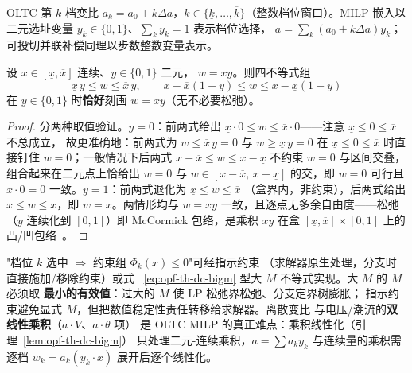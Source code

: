 \begin{definition}[离散档位与选址变量]\label{def:opf-th-dc-oltc}
OLTC 第 $k$ 档变比 $a_k=a_0+k\Delta a$，$k\in\{\underline k,\dots,
\overline k\}$（整数档位窗口）。MILP 嵌入以二元选址变量
$y_k\in\{0,1\}$、$\sum_ky_k=1$ 表示档位选择，
$a=\sum_k(a_0+k\Delta a)y_k$；可投切并联补偿同理以步数整数变量表示。
\end{definition}

\begin{lemma}
\label{lem:opf-th-dc-bigm}
设 $x\in[\underline x,\overline x]$ 连续、$y\in\{0,1\}$ 二元，
$w=xy$。则四不等式组
\begin{equation}
\underline x\,y\le w\le\overline x\,y,\qquad
x-\overline x(1-y)\le w\le x-\underline x(1-y)
\label{eq:opf-th-dc-bigm}
\end{equation}
在 $y\in\{0,1\}$ 时\textbf{恰好}刻画 $w=xy$（无不必要松弛）。
\end{lemma}

\begin{proof}
分两种取值验证。$y=0$：前两式给出 $\underline x\cdot0\le w\le
\overline x\cdot0$——注意 $\underline x\le0\le\overline x$ 不总成立，
故更准确地：前两式为 $w\le\overline x\,y=0$ 与 $w\ge\underline x\,y=0$
在 $\underline x\le0\le\overline x$ 时直接钉住 $w=0$；一般情况下后两式
$x-\overline x\le w\le x-\underline x$ 不约束 $w=0$ 与区间交叠，
组合起来在二元点上恰给出 $w=0$ 与
$w\in[x-\overline x,\,x-\underline x]$ 的交，即 $w=0$ 可行且
$x\cdot0=0$ 一致。$y=1$：前两式退化为 $\underline x\le w\le\overline x$
（盒界内，非约束），后两式给出 $x\le w\le x$，即 $w=x$。两情形均与
$w=xy$ 一致，且逐点无多余自由度——松弛（$y$ 连续化到 $[0,1]$）即
McCormick 包络，是乘积 $xy$ 在盒 $[\underline x,\overline x]\times[0,1]$
上的凸/凹包络~\cite{opfdc:nemhauser-wolsey}。
\end{proof}

\begin{remark}
\label{rem:opf-th-dc-indicator}
"档位 $k$ 选中 $\Rightarrow$ 约束组 $\Phi_k(x)\le0$"可经指示约束
（求解器原生处理，分支时直接施加/移除约束）或式
~\eqref{eq:opf-th-dc-bigm} 型大 $M$ 不等式实现。大 $M$ 的 $M$ 必须取
\textbf{最小的有效值}：过大的 $M$ 使 LP 松弛界松弛、分支定界树膨胀；
指示约束避免显式 $M$，但把数值稳定性责任转移给求解器。离散变比
与电压/潮流的\textbf{双线性乘积}（$a\cdot V$、$a\cdot\theta$ 项）
是 OLTC MILP 的真正难点：乘积线性化（引理~\ref{lem:opf-th-dc-bigm}）
只处理二元-连续乘积，$a=\sum a_ky_k$ 与连续量的乘积需逐档
$w_k=a_k(y_k\cdot x)$ 展开后逐个线性化。
\end{remark}

